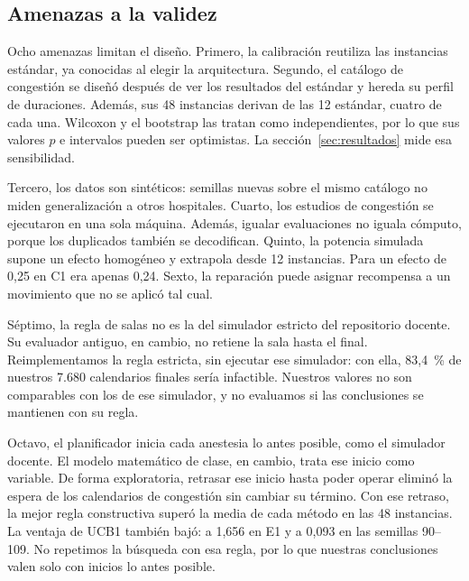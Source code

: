 \subsection{Amenazas a la validez}
\label{subsec:amenazas}
Ocho amenazas limitan el diseño. Primero, la calibración reutiliza las instancias
estándar, ya conocidas al elegir la arquitectura. Segundo, el catálogo de congestión
se diseñó después de ver los resultados del estándar y hereda su perfil de duraciones.
Además, sus 48 instancias derivan de las 12 estándar, cuatro de cada una. Wilcoxon y el
bootstrap las tratan como independientes, por lo que sus valores $p$ e intervalos pueden
ser optimistas. La sección~\ref{sec:resultados} mide esa sensibilidad.

Tercero, los datos son sintéticos: semillas nuevas sobre el mismo catálogo no miden
generalización a otros hospitales. Cuarto, los estudios de congestión se ejecutaron en
una sola máquina. Además, igualar evaluaciones no iguala cómputo, porque los duplicados
también se decodifican. Quinto, la potencia simulada supone un efecto homogéneo y
extrapola desde 12 instancias. Para un efecto de 0,25 en C1 era apenas 0,24.
Sexto, la reparación puede asignar recompensa a un movimiento que no se aplicó tal cual.

Séptimo, la regla de salas no es la del simulador estricto del repositorio docente. Su
evaluador antiguo, en cambio, no retiene la sala hasta el final. Reimplementamos
la regla estricta, sin ejecutar ese simulador: con ella,
83,4~\% de nuestros 7.680 calendarios finales sería infactible. Nuestros
valores no son comparables con los de ese simulador, y no evaluamos si las conclusiones
se mantienen con su regla.

Octavo, el planificador inicia cada anestesia lo antes posible, como el simulador docente.
El modelo matemático de clase, en cambio, trata ese inicio como variable. De forma
exploratoria, retrasar ese inicio hasta poder operar eliminó la espera de los calendarios de congestión
sin cambiar su término. Con ese retraso, la mejor regla constructiva superó la media de cada
método en las 48 instancias. La ventaja de UCB1 también bajó: a 1,656 en E1 y a 0,093 en las
semillas 90--109. No repetimos la búsqueda con esa regla, por lo que nuestras conclusiones
valen solo con inicios lo antes posible.%
\label{set-fin}
